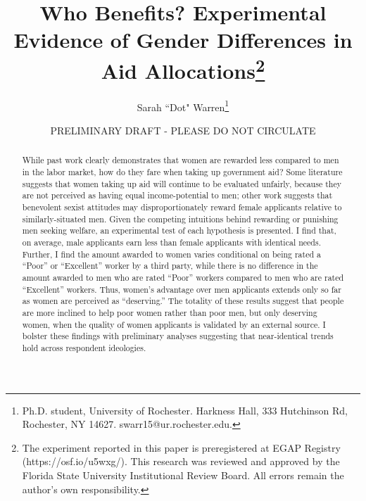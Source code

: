 \documentclass[12pt]{article}%
\author{Sarah ``Dot" Warren\thanks{Ph.D. student, University of Rochester. Harkness Hall, 333 Hutchinson Rd, Rochester, NY 14627. swarr15@ur.rochester.edu.}}
\title{Who Benefits? Experimental Evidence of Gender Differences in Aid Allocations\thanks{The experiment reported in this paper is preregistered at EGAP Registry (https://osf.io/u5wxg/). This research was reviewed and approved by the Florida State University Institutional Review Board. All errors remain the author's own responsibility.}}
\date{PRELIMINARY DRAFT - PLEASE DO NOT CIRCULATE}
\begin{document}
\maketitle
\thispagestyle{empty}


\begin{abstract}
While past work clearly demonstrates that women are rewarded less compared to men in the labor market, how do they fare when taking up government aid? Some literature suggests that women taking up aid will continue to be evaluated unfairly, because they are not perceived as having equal income-potential to men; other work suggests that benevolent sexist attitudes may disproportionately reward female applicants relative to similarly-situated men. Given the competing intuitions behind rewarding or punishing men seeking welfare, an experimental test of each hypothesis is presented. I find that, on average, male applicants earn less than female applicants with identical needs. Further, I find the amount awarded to women varies conditional on being rated a ``Poor” or ``Excellent” worker by a third party, while there is no difference in the amount awarded to men who are rated ``Poor” workers compared to men who are rated ``Excellent” workers. Thus, women’s advantage over men applicants extends only so far as women are perceived as ``deserving.” The totality of these results suggest that people are more inclined to help poor women rather than poor men, but only deserving women, when the quality of women applicants is validated by an external source. I bolster these findings with preliminary analyses suggesting that near-identical trends hold across respondent ideologies. %
\end{abstract}


\newpage
\end{document}

